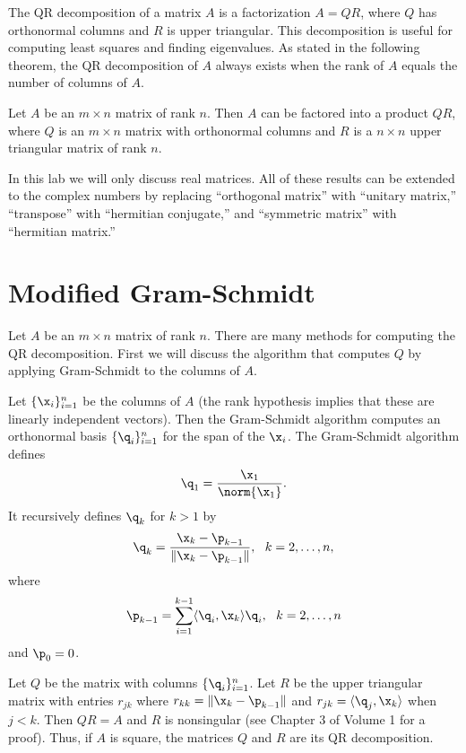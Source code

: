 \label{lab:QRdecomp}

The QR decomposition of a matrix $A$ is a factorization $A=QR$, where $Q$ has orthonormal columns and $R$ is upper triangular.
This decomposition is useful for computing least squares and finding eigenvalues.
As stated in the following theorem, the QR decomposition of $A$ always exists when the rank of $A$ equals the number of columns of $A$.
\begin{theorem}
Let $A$ be an $m\times n$ matrix of rank $n$.  Then $A$ can be
factored into a product $Q R$, where $Q$ is an $m\times n$ matrix
with orthonormal columns and $R$ is a $n \times n$ upper
triangular matrix of rank $n$.
\end{theorem}

In this lab we will only discuss real matrices. 
All of these results can be extended to the complex numbers by replacing ``orthogonal matrix'' with ``unitary matrix,'' ``transpose'' with ``hermitian conjugate,'' and ``symmetric matrix'' with ``hermitian matrix.''

\section*{Modified Gram-Schmidt}
Let $A$ be an $m \times n$ matrix of rank $n$.
There are many methods for computing the QR decomposition.
First we will discuss the algorithm that computes $Q$ by applying Gram-Schmidt to the columns of $A$.

Let $\{\x_i\}_{i=1}^n$ be the columns of $A$ (the rank hypothesis implies that these are linearly independent vectors).
Then the Gram-Schmidt algorithm computes an orthonormal basis $\{\q_i\}_{i=1}^n$ for the span of the $\x_i$. 
The Gram-Schmidt algorithm defines  \[ \q_1 = \frac{\x_1}{\norm{\x_1}}.\]
It recursively defines $\q_k$ for $k>1$ by
\[
\q_{k} = \frac{\x_k - \p_{k-1}}{\|\x_k - \p_{k-1}\|}, \,\,\,\, k=2,\ldots,n,
\]
where
\[
\p_{k-1} = \sum_{i=1}^{k-1} \langle \q_i, \x_k\rangle \q_i, \,\,\,\, k=2, \ldots, n
\]
and $\p_0 = 0$. 


Let $Q$ be the matrix with columns $\{\q_i\}_{i=1}^n$. 
Let $R$ be the upper triangular matrix with entries $r_{jk}$ where $r_{kk} = \|\x_k-\p_{k-1}\|$ and $r_{j k} = \langle \q_j, \x_k\rangle$ when $j < k$. 
Then $QR=A$ and $R$ is nonsingular (see Chapter 3 of Volume 1 for a proof).
Thus, if $A$ is square, the matrices $Q$ and $R$ are its QR decomposition.


